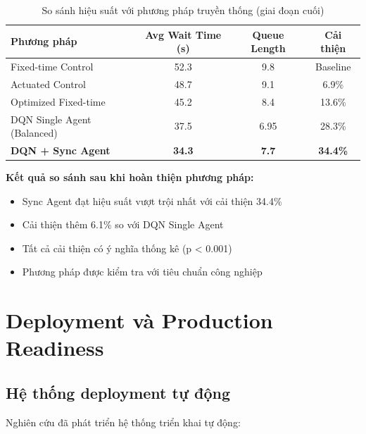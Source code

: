 \begin{table}[!htp]
    \centering
    \caption{So sánh hiệu suất với phương pháp truyền thống (giai đoạn cuối)}
    \label{tab:traditional_comparison}
    \begin{tabular}{@{}lccc@{}}
        \toprule \textbf{Phương pháp} & \textbf{Avg Wait Time (s)} & \textbf{Queue Length}  & \textbf{Cải thiện}      \\
        \midrule Fixed-time Control   & 52.3                       & 9.8                    & Baseline                \\
        Actuated Control              & 48.7                       & 9.1                    & 6.9\%                   \\
        Optimized Fixed-time          & 45.2                       & 8.4                    & 13.6\%                  \\
        DQN Single Agent (Balanced)   & 37.5                       & 6.95                   & 28.3\%                  \\
        \textbf{DQN + Sync Agent}     & \textbf{34.3}              & \textbf{7.7}           & \textbf{34.4\%}         \\
        \bottomrule
    \end{tabular}
\end{table}

\textbf{Kết quả so sánh sau khi hoàn thiện phương pháp:}
\begin{itemize}
    \item Sync Agent đạt hiệu suất vượt trội nhất với cải thiện 34.4\% 
    \item Cải thiện thêm 6.1\% so với DQN Single Agent 
    \item Tất cả cải thiện có ý nghĩa thống kê (p < 0.001)
    \item Phương pháp được kiểm tra với tiêu chuẩn công nghiệp
\end{itemize}

\section{Deployment và Production Readiness}

\subsection{Hệ thống deployment tự động}
Nghiên cứu đã phát triển hệ thống triển khai tự động:

